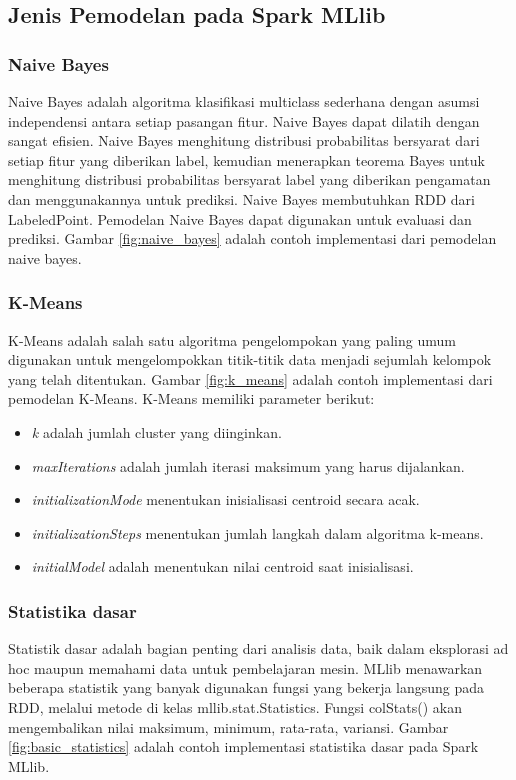 \subsection{Jenis Pemodelan pada Spark MLlib}

\subsubsection{Naive Bayes}

Naive Bayes adalah algoritma klasifikasi multiclass sederhana dengan asumsi independensi antara setiap pasangan fitur. Naive Bayes dapat dilatih dengan sangat efisien. Naive Bayes menghitung distribusi probabilitas bersyarat dari setiap fitur yang diberikan label, kemudian menerapkan teorema Bayes untuk menghitung distribusi probabilitas bersyarat label yang diberikan pengamatan dan menggunakannya untuk prediksi. Naive Bayes membutuhkan RDD dari LabeledPoint. Pemodelan Naive Bayes dapat digunakan untuk evaluasi dan prediksi. Gambar \ref{fig:naive_bayes} adalah contoh implementasi dari pemodelan naive bayes.
 

\subsubsection{K-Means}
K-Means adalah salah satu algoritma pengelompokan yang paling umum digunakan untuk mengelompokkan titik-titik data menjadi sejumlah kelompok yang telah ditentukan. Gambar \ref{fig:k_means} adalah contoh implementasi dari pemodelan K-Means. K-Means memiliki parameter berikut:

\begin{itemize}
\item \textit{k} adalah jumlah cluster yang diinginkan. 
\item \textit{maxIterations} adalah jumlah iterasi maksimum yang harus dijalankan.
\item \textit{initializationMode} menentukan inisialisasi centroid secara acak.
\item \textit{initializationSteps} menentukan jumlah langkah dalam algoritma k-means.
\item \textit{initialModel} adalah menentukan nilai centroid saat inisialisasi.
\end{itemize}


\subsubsection{Statistika dasar}
Statistik dasar adalah bagian penting dari analisis data, baik dalam eksplorasi ad hoc maupun memahami data untuk pembelajaran mesin. MLlib menawarkan beberapa statistik yang banyak digunakan fungsi yang bekerja langsung pada RDD, melalui metode di kelas mllib.stat.Statistics. Fungsi colStats() akan mengembalikan nilai maksimum, minimum, rata-rata, variansi. Gambar \ref{fig:basic_statistics} adalah contoh implementasi statistika dasar pada Spark MLlib.



